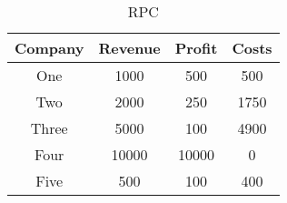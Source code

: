 \documentclass{article}
\begin{document}
\begin{table}[h]
\centering
\begin{tabular}{| c | c | c | c |}
\hline
Company & Revenue & Profit & Costs \\ 
\hline
One & 1000 & 500 & 500 \\ 
\hline
Two & 2000 & 250 & 1750 \\ 
\hline
Three & 5000 & 100 & 4900 \\ 
\hline
Four & 10000 & 10000 & 0 \\ 
\hline
Five & 500 & 100 & 400 \\
\hline
\end{tabular}
\caption{RPC}
\label{tab:table_1}
\end{table}
\end{document}
